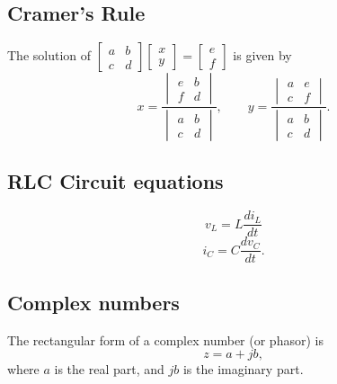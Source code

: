 \documentclass[letterpaper]{scrartcl}
\begin{document}
\subsection*{Cramer's Rule}
The solution of
\(\begin{bmatrix}
a & b \\
c & d
\end{bmatrix}
\begin{bmatrix}
x \\
y
\end{bmatrix}
=
\begin{bmatrix}
e \\
f
\end{bmatrix}\)
is given by
\begin{equation}\label{eqn:karlCircuitsCheatSheet:100}
x = \frac{
   \begin{vmatrix}
   e & b \\
   f & d
   \end{vmatrix}
}{
   \begin{vmatrix}
   a & b \\
   c & d
   \end{vmatrix}
},
\qquad
y = \frac{
   \begin{vmatrix}
   a & e \\
   c & f
   \end{vmatrix}
}{
   \begin{vmatrix}
   a & b \\
   c & d
   \end{vmatrix}
}.
\end{equation}
\subsection*{RLC Circuit equations}
\begin{equation}\label{eqn:karlCircuitsCheatSheet:120}
v_L = L \frac{di_L}{dt}
\end{equation}
\begin{equation}\label{eqn:karlCircuitsCheatSheet:140}
i_C = C \frac{dv_C}{dt}.
\end{equation}
\subsection*{Complex numbers}
The rectangular form of a complex number (or phasor) is
\begin{equation}\label{eqn:karlCircuitsCheatSheet:160}
z = a + j b,
\end{equation}
where \( a \) is the real part, and \( j b \) is the imaginary part.
\end{document}
